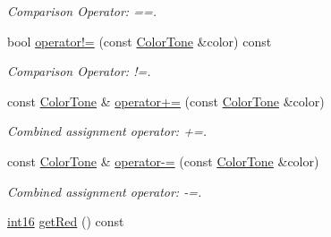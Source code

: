 \begin{DoxyCompactItemize}
\begin{DoxyCompactList}\small\item\em Comparison Operator: ==. \item\end{DoxyCompactList}\item 
\hypertarget{class_f2_c_1_1_color_tone_aef6521763ccb2e1cf912497afb8b8648}{
bool \hyperlink{class_f2_c_1_1_color_tone_aef6521763ccb2e1cf912497afb8b8648}{operator!=} (const \hyperlink{class_f2_c_1_1_color_tone}{ColorTone} \&color) const }
\label{class_f2_c_1_1_color_tone_aef6521763ccb2e1cf912497afb8b8648}

\begin{DoxyCompactList}\small\item\em Comparison Operator: !=. \item\end{DoxyCompactList}\item 
\hypertarget{class_f2_c_1_1_color_tone_adfe3ce161ef3dc3465e7b3d032a8fa76}{
const \hyperlink{class_f2_c_1_1_color_tone}{ColorTone} \& \hyperlink{class_f2_c_1_1_color_tone_adfe3ce161ef3dc3465e7b3d032a8fa76}{operator+=} (const \hyperlink{class_f2_c_1_1_color_tone}{ColorTone} \&color)}
\label{class_f2_c_1_1_color_tone_adfe3ce161ef3dc3465e7b3d032a8fa76}

\begin{DoxyCompactList}\small\item\em Combined assignment operator: +=. \item\end{DoxyCompactList}\item 
\hypertarget{class_f2_c_1_1_color_tone_a466a1bd70f8cbe071560484347ddc762}{
const \hyperlink{class_f2_c_1_1_color_tone}{ColorTone} \& \hyperlink{class_f2_c_1_1_color_tone_a466a1bd70f8cbe071560484347ddc762}{operator-\/=} (const \hyperlink{class_f2_c_1_1_color_tone}{ColorTone} \&color)}
\label{class_f2_c_1_1_color_tone_a466a1bd70f8cbe071560484347ddc762}

\begin{DoxyCompactList}\small\item\em Combined assignment operator: -\/=. \item\end{DoxyCompactList}\item 
\hypertarget{class_f2_c_1_1_color_tone_a03bc48742b38e1123150a061d7816a0e}{
\hyperlink{namespace_f2_c_ab83c1e14d784a7d520d770ca6fa8fd8e}{int16} \hyperlink{class_f2_c_1_1_color_tone_a03bc48742b38e1123150a061d7816a0e}{getRed} () const }
\label{class_f2_c_1_1_color_tone_a03bc48742b38e1123150a061d7816a0e}


\end{DoxyCompactItemize}
